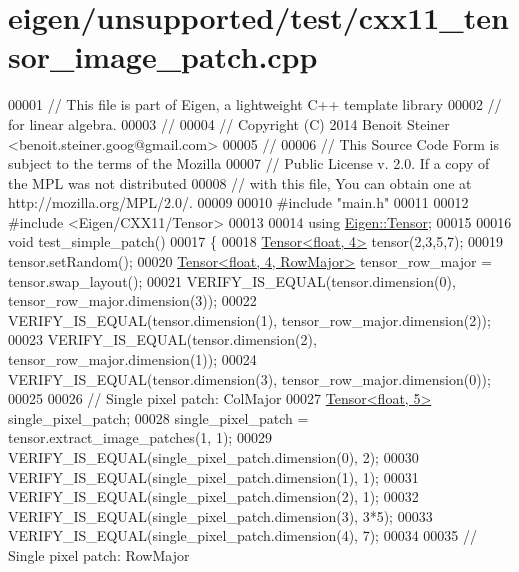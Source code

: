 \hypertarget{eigen_2unsupported_2test_2cxx11__tensor__image__patch_8cpp_source}{}\section{eigen/unsupported/test/cxx11\+\_\+tensor\+\_\+image\+\_\+patch.cpp}
\label{eigen_2unsupported_2test_2cxx11__tensor__image__patch_8cpp_source}

\begin{DoxyCode}
00001 \textcolor{comment}{// This file is part of Eigen, a lightweight C++ template library}
00002 \textcolor{comment}{// for linear algebra.}
00003 \textcolor{comment}{//}
00004 \textcolor{comment}{// Copyright (C) 2014 Benoit Steiner <benoit.steiner.goog@gmail.com>}
00005 \textcolor{comment}{//}
00006 \textcolor{comment}{// This Source Code Form is subject to the terms of the Mozilla}
00007 \textcolor{comment}{// Public License v. 2.0. If a copy of the MPL was not distributed}
00008 \textcolor{comment}{// with this file, You can obtain one at http://mozilla.org/MPL/2.0/.}
00009 
00010 \textcolor{preprocessor}{#include "main.h"}
00011 
00012 \textcolor{preprocessor}{#include <Eigen/CXX11/Tensor>}
00013 
00014 \textcolor{keyword}{using} \hyperlink{class_eigen_1_1_tensor}{Eigen::Tensor};
00015 
00016 \textcolor{keywordtype}{void} test\_simple\_patch()
00017 \{
00018   \hyperlink{class_eigen_1_1_tensor}{Tensor<float, 4>} tensor(2,3,5,7);
00019   tensor.setRandom();
00020   \hyperlink{class_eigen_1_1_tensor}{Tensor<float, 4, RowMajor>} tensor\_row\_major = tensor.swap\_layout();
00021   VERIFY\_IS\_EQUAL(tensor.dimension(0), tensor\_row\_major.dimension(3));
00022   VERIFY\_IS\_EQUAL(tensor.dimension(1), tensor\_row\_major.dimension(2));
00023   VERIFY\_IS\_EQUAL(tensor.dimension(2), tensor\_row\_major.dimension(1));
00024   VERIFY\_IS\_EQUAL(tensor.dimension(3), tensor\_row\_major.dimension(0));
00025 
00026   \textcolor{comment}{// Single pixel patch: ColMajor}
00027   \hyperlink{class_eigen_1_1_tensor}{Tensor<float, 5>} single\_pixel\_patch;
00028   single\_pixel\_patch = tensor.extract\_image\_patches(1, 1);
00029   VERIFY\_IS\_EQUAL(single\_pixel\_patch.dimension(0), 2);
00030   VERIFY\_IS\_EQUAL(single\_pixel\_patch.dimension(1), 1);
00031   VERIFY\_IS\_EQUAL(single\_pixel\_patch.dimension(2), 1);
00032   VERIFY\_IS\_EQUAL(single\_pixel\_patch.dimension(3), 3*5);
00033   VERIFY\_IS\_EQUAL(single\_pixel\_patch.dimension(4), 7);
00034 
00035   \textcolor{comment}{// Single pixel patch: RowMajor}

\end{DoxyCode}
